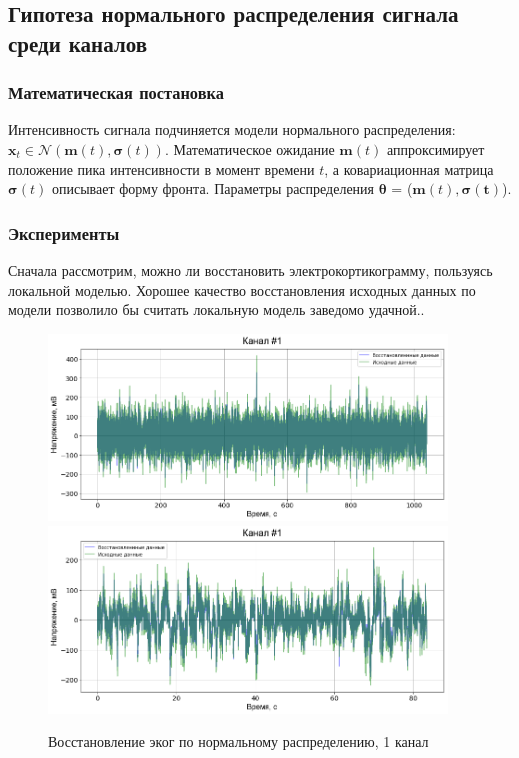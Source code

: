 \documentclass{mipt-thesis-bs}
\begin{document}
\subsection{Гипотеза нормального распределения сигнала среди каналов}
\subsubsection{Математическая постановка} 
Интенсивность сигнала подчиняется модели нормального распределения: $\mathbf{x}_t \in \mathcal{N}(\mathbf{m}(t),\mathbf{\sigma}(t))$. Математическое ожидание $\mathbf{m}(t)$ аппроксимирует положение пика интенсивности в момент времени $t$, а ковариационная матрица $\mathbf{\sigma}(t)$ описывает форму фронта. Параметры распределения $\mathbf{\theta}$ = ($\mathbf{m}(t), \mathbf{\sigma(t)}$).
\subsubsection{Эксперименты}
Сначала рассмотрим, можно ли восстановить электрокортикограмму, пользуясь локальной моделью. Хорошее качество восстановления исходных данных по модели позволило бы считать локальную модель заведомо удачной..

\begin{figure}
\begin{center}
	\includegraphics[width=300pt,height=\textheight,keepaspectratio]{imgs/Gauss_ch1.png}
	\includegraphics[width=300pt,height=\textheight,keepaspectratio]{imgs/Gauss_ch1_80s.png}
	\caption{Восстановление эког по нормальному распределению, 1 канал}	
	\label{fig:gauss ecog}
	\end{center}
\end{figure}
\end{document}
